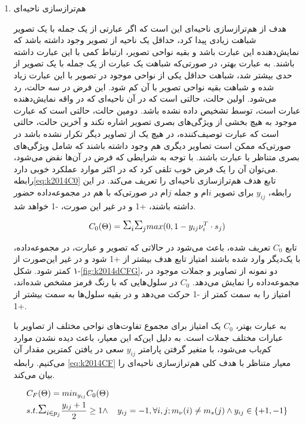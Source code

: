 \begin{enumerate}
	\item هم‌ترازسازی ناحیه‌ای 
	
	هدف از هم‌ترازسازی ناحیه‌ای این است که اگر عبارتی از یک جمله با یک تصویر شباهت زیادی پیدا کرد، حداقل یک ناحیه از تصویر وجود داشته باشد که نمایش‌دهنده این عبارت باشد و بقیه نواحی تصویر، ارتباط کمی با این عبارت داشته باشند. به عبارت بهتر، در صورتی‌که شباهت یک عبارت از یک جمله با یک تصویر از حدی بیشتر شد، شباهت حداقل یکی از نواحی موجود در تصویر با این عبارت زیاد شده و شباهت بقیه نواحی تصویر با آن کم شود. این فرض در سه حالت، رد می‌شود. اولین حالت، حالتی است که در آن ناحیه‌ای که در واقه نمایش‌دهنده عبارت است، توسط  تشخیص داده نشده باشد. دومین حالت، حالتی است که عبارت موجود به هیچ بخشی از ویژگی‌های بصری تصویر اشاره نکند و آخرین حالت، حالتی است که عبارت توصیف‌کننده، در هیچ یک از تصاویر دیگر تکرار نشده باشد در صورتی‌که ممکن است تصاویر دیگری هم وجود داشته باشند که شامل ویژگی‌های بصری متناظر با عبارت باشند. با توجه به شرایطی که فرض در آن‌ها نقض می‌شود، می‌توان آن را یک فرض خوب تلقی کرد که در اکثر موارد عملکرد خوبی دارد.
	\\
	رابطه\ref{eq:k2014C0}
	تابع هدف هم‌ترازسازی ناحیه‌ای را تعریف‌ می‌کند. در این رابطه، $y_{ij}$ برای تصویر $i$ام و جمله $j$ام در صورتی‌که با هم در مجموعه‌داده حضور داشته باشند، +1 و در غیر این‌ صورت، -1 خواهد شد.
	
	\begin{equation}
	C_0(\Theta) = \ML{\Sigma}_i \ML{\Sigma}_j max(0 , 1 - y_{ij} \nu_i^T \cdot s_j)
	\label{eq:k2014C0}
	\end{equation}
	
	تابع $C_0$ تعریف شده، باعث می‌شود در حالاتی که تصویر و عبارت، در مجموعه‌داده، با یک‌دیگر وارد شده باشند امتیاز تابع هدف بیشتر از +1 شود و در غیر این‌صورت از -۱ کمتر شود. شکل\ref{fig:k2014dCFG}،
	دو نمونه از تصاویر و جملات موجود در مجموعه‌داده را نمایش می‌دهد. 
	$C_0$ 
	در سلول‌هایی که با رنگ قرمز مشخص شده‌اند، امتیاز را به سمت کمتر از -1 حرکت می‌دهد و در بقیه سلول‌ها به سمت بیشتر از +1.
	
	به عبارت بهتر، $C_0$ یک امتیاز برای مجموع تفاوت‌های نواحی مختلف از تصاویر با عبارات مختلف جملات است. به دلیل این‌که این معیار، باعث دیده نشدن موارد کم‌یاب می‌شود، با متغیر گرفتن پارامتر $y_{ij}$ سعی در یافتن کمترین مقدار آن می‌کنیم. رابطه 
	\ref{eq:k2014CF}
	معیار متناظر با هدف کلی هم‌ترازسازی ناحیه‌ای را بیان می‌کند.
	
	\begin{align}
	&C_F(\Theta) = min_{y_{ij}} C_0(\Theta)
	\nonumber
	\\
	&s.t. \ML{\Sigma}_{i \in p_j} \frac{y_{ij} + 1}{2} \geq 1 \land
	&y_{ij} = -1, \forall i,j ; m_\nu(i) \neq m_s(j) \land y_{ij} \in \{+1, -1\}
	\label{eq:k2014CF}
	\end{align}
	

\end{enumerate}
